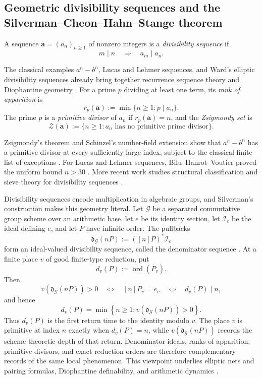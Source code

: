 \documentclass[11pt,letterpaper,reqno]{amsart}
\theoremstyle{definition}
\theoremstyle{remark}
\newcommand{\ord}{\operatorname{ord}}
\begin{document}
\subsection{Geometric divisibility sequences and the
Silverman--Cheon--Hahn--Stange theorem}

A sequence $\mathbf a=(a_n)_{n\ge1}$ of nonzero integers is a
\emph{divisibility sequence} if
\[
 m\mid n\quad\Longrightarrow\quad a_m\mid a_n.
\]

The classical examples $a^n-b^n$, Lucas and Lehmer sequences, and Ward's elliptic divisibility sequences already bring together recurrence sequence theory and Diophantine geometry
\cite{Ward1948,EverestPoortenShparlinskiWard2003}.  For a prime $p$ dividing at least one term, its \emph{rank of apparition} is
\[
 r_p(\mathbf a):=\min\{n\ge1:p\mid a_n\}.
\]
The prime $p$ is a \emph{primitive divisor} of $a_n$ if
$r_p(\mathbf a)=n$, and the \emph{Zsigmondy set} is
\[
 \mathcal Z(\mathbf a)
 :=\{n\ge1:a_n\text{ has no primitive prime divisor}\}.
\]

Zsigmondy's theorem and Schinzel's number-field extension show that $a^n-b^n$ has a
primitive divisor at every sufficiently large index, subject to the classical
finite list of exceptions \cite{Zsigmondy1892,Schinzel1974}.  For Lucas and
Lehmer sequences, Bilu--Hanrot--Voutier proved the uniform bound $n>30$
\cite{BiluHanrotVoutier2001}.  More recent work studies structural
classification and sieve theory for divisibility sequences
\cite{Granville2022,BrowningVerzobio2024}.

Divisibility sequences encode multiplication in algebraic groups, and
Silverman's construction makes this geometry literal.  Let $\mathcal G$ be a
separated commutative group scheme over an arithmetic base, let $e$ be its
identity section, let $\mathcal I_e$ be the ideal defining $e$, and let $P$
have infinite order.  The pullbacks
\[
 \mathfrak d_{\mathcal G}(nP):=([n]P)^*\mathcal I_e
\]
form an ideal-valued divisibility sequence, called the denominator sequence
\cite[Definition~4 and Proposition~8]{Silverman2005}.  At a finite place $v$
of good finite-type reduction, put
\[
 d_v(P):=\ord(\overline P_v).
\]
Then
\[
 v\!\left(\mathfrak d_{\mathcal G}(nP)\right)>0
 \quad\Longleftrightarrow\quad
 [n]\overline P_v=e_v
 \quad\Longleftrightarrow\quad
 d_v(P)\mid n,
\]
and hence
\[
 d_v(P)=
 \min\left\{
 n\ge1:
 v\!\left(\mathfrak d_{\mathcal G}(nP)\right)>0
 \right\}.
\]
Thus $d_v(P)$ is the first return time to the identity modulo $v$.  The place
$v$ is primitive at index $n$ exactly when $d_v(P)=n$, while
$v(\mathfrak d_{\mathcal G}(nP))$ records the scheme-theoretic depth of that
return.  Denominator ideals, ranks of apparition, primitive divisors, and
exact reduction orders are therefore complementary records of the same local
phenomenon.  This viewpoint underlies elliptic nets and pairing formulas,
Diophantine definability, and arithmetic dynamics
\cite{Stange2007,Stange2011,LauterStange2009,Poonen2002,
IngramSilverman2009,Stange2026}.
\end{document}
